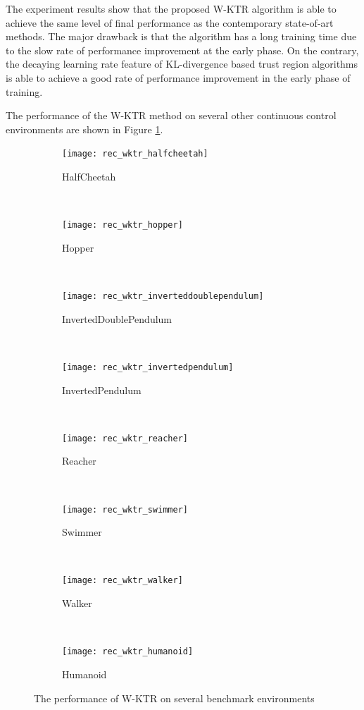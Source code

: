 The experiment results show that the proposed W-KTR algorithm is able to achieve the same level of final performance as the contemporary state-of-art methods. The major drawback is that the algorithm has a long training time due to the slow rate of performance improvement at the early phase. On the contrary, the decaying learning rate feature of KL-divergence based trust region algorithms is able to achieve a good rate of performance improvement in the early phase of training.

The performance of the W-KTR method on several other continuous control environments are shown in Figure \ref{fig:wktr_bench}.
\begin{figure}[!htbp]
	\centering
	\begin{subfigure}[t]{0.4\textwidth}
		\centering
		\texttt{[image: rec\_wktr\_halfcheetah]}
		\caption{HalfCheetah}
	\end{subfigure}%
	~ 
	\begin{subfigure}[t]{0.4\textwidth}
		\centering
		\texttt{[image: rec\_wktr\_hopper]}
		\caption{Hopper}
	\end{subfigure}
	~ 
	\begin{subfigure}[t]{0.4\textwidth}
		\centering
		\texttt{[image: rec\_wktr\_inverteddoublependulum]}
		\caption{InvertedDoublePendulum}
	\end{subfigure}
	~ 
	\begin{subfigure}[t]{0.4\textwidth}
		\centering
		\texttt{[image: rec\_wktr\_invertedpendulum]}
		\caption{InvertedPendulum}
	\end{subfigure}
	~ 
	\begin{subfigure}[t]{0.4\textwidth}
		\centering
		\texttt{[image: rec\_wktr\_reacher]}
		\caption{Reacher}
	\end{subfigure}
	~ 
	\begin{subfigure}[t]{0.4\textwidth}
		\centering
		\texttt{[image: rec\_wktr\_swimmer]}
		\caption{Swimmer}
	\end{subfigure}
	~ 
	\begin{subfigure}[t]{0.4\textwidth}
		\centering
		\texttt{[image: rec\_wktr\_walker]}
		\caption{Walker}
	\end{subfigure}
	~ 
	\begin{subfigure}[t]{0.4\textwidth}
		\centering
		\texttt{[image: rec\_wktr\_humanoid]}
		\caption{Humanoid}
	\end{subfigure}

	\caption{The performance of W-KTR on several benchmark environments}
	\label{fig:wktr_bench}
\end{figure}
